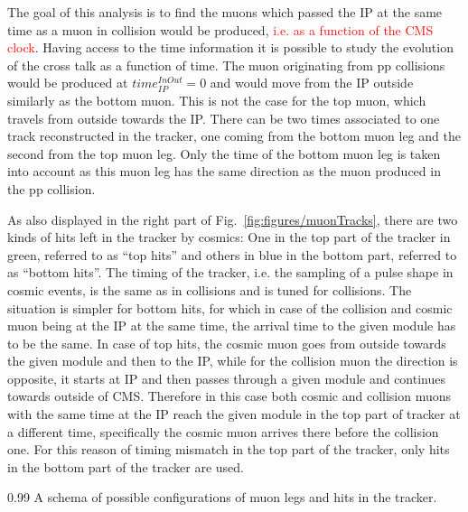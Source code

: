 The goal of this analysis is to find the muons which passed the IP at the same time as a muon in collision would be produced, \textcolor{red}{i.e. as a function of the CMS clock}. Having access to the time information it is possible to study the evolution of the cross talk as a function of time. The muon originating from pp collisions would be produced at $time_{IP}^{InOut}=0$ and would move from the IP outside similarly as the bottom muon. This is not the case for the top muon, which travels from outside towards the IP. There can be two times associated to one track reconstructed in the tracker, one coming from the bottom muon leg and the second from the top muon leg. Only the time of the bottom muon leg is taken into account as this muon leg has the same direction as the muon produced in the pp collision. 

As also displayed in the right part of Fig.~\ref{fig:figures/muonTracks}, there are two kinds of hits left in the tracker by cosmics: One in the top part of the tracker in green, referred to as ``top hits'' and others in blue in the bottom part, referred to as ``bottom hits''. The timing of the tracker, i.e. the sampling of a pulse shape in cosmic events, is the same as in collisions and is tuned for collisions.  The situation is simpler for bottom hits, for which in case of the collision and cosmic muon being at the IP at the same time, the arrival time to the given module has to be the same. In case of top hits, the cosmic muon goes from outside towards the given module and then to the IP, while for the collision muon the direction is opposite, it starts at IP and then passes through a given module and continues towards outside of CMS. Therefore in this case both cosmic and collision muons with the same time at the IP reach the given module in the top part of tracker at a different time, specifically the cosmic muon arrives there before the collision one. For this reason of timing mismatch in the top part of the tracker, only hits in the bottom part of the tracker are used.

                 {0.99}       %
                 { A schema of possible configurations of muon legs and hits in the tracker. }


